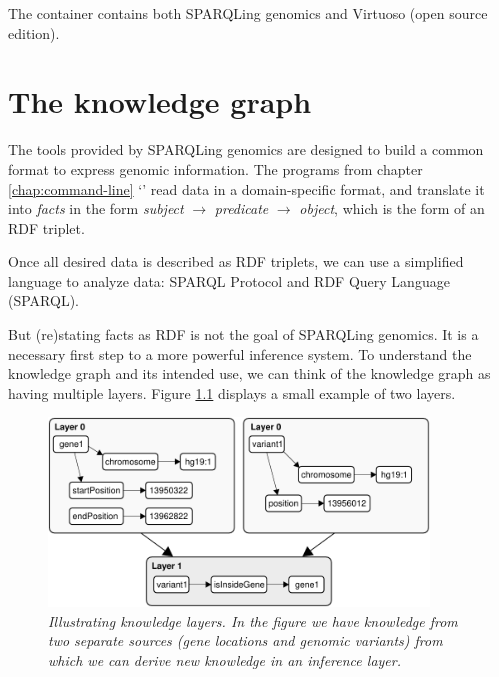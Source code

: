   The container contains both SPARQLing genomics and Virtuoso (open source
  edition).

\chapter{The knowledge graph}

  The tools provided by SPARQLing genomics are designed to build a
  common format to express genomic information.  The programs from chapter
  \ref{chap:command-line} {\color{LinkGray}`'}
  read data in a domain-specific format, and translate it into \emph{facts}
  in the form \emph{subject} $\rightarrow$ \emph{predicate} $\rightarrow$
  \emph{object}, which is the form of an RDF triplet.

  Once all desired data is described as RDF triplets, we can use a simplified
  language to analyze data: SPARQL Protocol and RDF Query Language (SPARQL).

  But (re)stating facts as RDF is not the goal of SPARQLing genomics.  It is
  a necessary first step to a more powerful inference system.  To understand
  the knowledge graph and its intended use, we can think of the knowledge
  graph as having multiple layers.  Figure \ref{fig:layered-knowledge}
  displays a small example of two layers.

  \begin{figure}[h]
    \begin{center}
    \includegraphics[width=0.9\textwidth]{figures/layered-knowledge.pdf}
    \end{center}
    \caption{\textit{Illustrating knowledge layers.  In the figure we have
        knowledge from two separate sources (gene locations and genomic
        variants) from which we can derive new knowledge in an inference
        layer.}}
    \label{fig:layered-knowledge}
  \end{figure}

